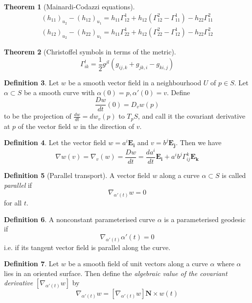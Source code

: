 \documentclass[10pt, oneside, reqno]{amsart}
\newcommand{\christ}[3]{\ensuremath{\Gamma^{#1}_{#2#3}}}
\theoremstyle{plain}%
\newtheorem{thm}{Theorem}[section]
\theoremstyle{definition}
\newtheorem{defn}[thm]{Definition}
\theoremstyle{remark}
\begin{document}
\begin{thm}[Mainardi-Codazzi equations]
    \begin{align*}
        (h_{11})_{u_2} - (h_{12})_{u_1} = h_{11} \christ{1}{1}{2} + h_{12}(\christ{2}{1}{2}-\christ{1}{1}{1}) - h_{22}\christ{2}{1}{1} \\
            (h_{12})_{u_2} - (h_{22})_{u_1} = h_{11} \christ{1}{2}{2} + h_{12}(\christ{2}{2}{2}-\christ{1}{1}{2}) - h_{22}\christ{2}{1}{2} 
    \end{align*}
\end{thm}

\begin{thm}[Christoffel symbols in terms of the metric]
    \[
        \christ{l}{i}{k} = \frac{1}{2}g^{jl}\left( g_{ij,k} + g_{jk,i} - g_{ki,j} \right)
    \]
\end{thm}

\begin{defn}
    Let $w$ be a smooth vector field in a neighbourhood $U$ of $p \in S$.  Let $\alpha \subset S$ be a smooth curve with $\alpha(0) = p, \alpha'(0) = v$.  Define \[
        \frac{Dw}{dt}(0) = D_v w(p)
    \]
    to be the projection of $\frac{dw}{dt} = dw_v(p)$ to $T_p S$, and call it the covariant derivative at $p$ of the vector field $w$ in the direction of $v$.
\end{defn}


\begin{defn}
    Let the vector field $w = a^i \mathbf{E_i}$ and $v = b^j \mathbf{E_j}$.  Then we have \[
        \nabla w (v) = \nabla_v(w) = \frac{Dw}{dt} = \frac{da^i}{dt}\mathbf{E_i} + a^i b^j \christ{k}{i}{j} \mathbf{E_k}
    \]
\end{defn}

\begin{defn}[Parallel transport]
    A vector field $w$ along a curve $\alpha \subset S$ is called \emph{parallel} if \[
        \nabla_{\alpha'(t)}w = 0
    \]
    for all $t$.
\end{defn}

\begin{defn}
    A nonconstant parameterised curve $\alpha$ is a parameterised geodesic if \[
    \nabla_{\alpha'(t)} \alpha'(t) = 0  
    \]
    i.e. if its tangent vector field is parallel along the curve.
\end{defn}

\begin{defn}
    Let $w$ be a smooth field of unit vectors along a curve $\alpha$ where $\alpha$ lies in an oriented surface.  Then define the \emph{algebraic value of the covariant derivative} $[ \nabla_{\alpha'(t)}w]$ by \[
            \nabla_{\alpha'(t)}w = [    \nabla_{\alpha'(t)}w] \mathbf{N} \times w(t)
    \]
\end{defn}
\end{document}
